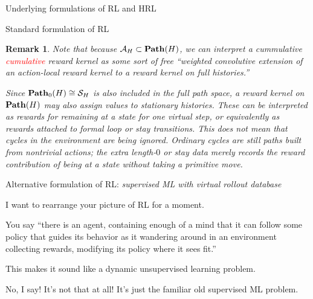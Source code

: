 \documentclass[11pt]{article}
\newtheorem{remark}[subsubsection]{Remark}
\begin{document}
\begin{section}{Underlying formulations of RL and HRL}
\begin{subsection}{Standard formulation of RL}
\begin{remark}
\normalfont
Note that because $\mathcal{A}_{H}\subset\bold{Path}(H)$, we can interpret a cummulative \textcolor{red}{cumulative} reward kernel as some sort of free ``weighted convolutive extension of an action-local reward kernel to a reward kernel on full histories.''

Since $\bold{Path}_{0}(H)\cong\mathcal{S}_{H}$ is also included in the full path space, a reward kernel on $\bold{Path}(H)$ may also assign values to stationary histories. These can be interpreted as rewards for remaining at a state for one virtual step, or equivalently as rewards attached to formal loop or stay transitions. This does not mean that cycles in the environment are being ignored. Ordinary cycles are still paths built from nontrivial actions; the extra length-$0$ or stay data merely records the reward contribution of being at a state without taking a primitive move.
\end{remark}
 
\end{subsection}

\begin{subsection}{Alternative formulation of RL: {\em supervised ML with virtual rollout database}}

I want to rearrange your picture of RL for a moment.

You say ``there is an agent, containing enough of a mind that it can follow some policy that guides its behavior as it wandering around in an environment collecting rewards, modifying its policy where it sees fit.'' 

This makes it sound like a dynamic unsupervised learning problem. 

No, I say! It's not that at all! It's just the familiar old supervised ML problem.


\end{subsection}
\end{section}
\end{document}
